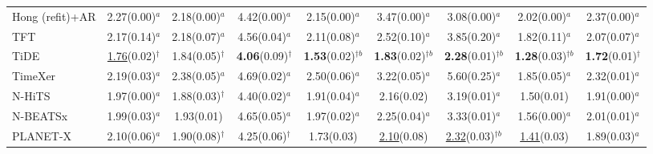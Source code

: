 \begin{table}[!t]
\begin{adjustbox}{max width=\linewidth}
\begin{tabular}{lcccccccc}
Hong (refit)+AR & 2.27{\scriptsize\color{gray}(0.00)}$^{a}$ & 2.18{\scriptsize\color{gray}(0.00)}$^{a}$ & 4.42{\scriptsize\color{gray}(0.00)}$^{a}$ & 2.15{\scriptsize\color{gray}(0.00)}$^{a}$ & 3.47{\scriptsize\color{gray}(0.00)}$^{a}$ & 3.08{\scriptsize\color{gray}(0.00)}$^{a}$ & 2.02{\scriptsize\color{gray}(0.00)}$^{a}$ & 2.37{\scriptsize\color{gray}(0.00)}$^{a}$ \\
TFT & 2.17{\scriptsize\color{gray}(0.14)}$^{a}$ & 2.18{\scriptsize\color{gray}(0.07)}$^{a}$ & 4.56{\scriptsize\color{gray}(0.04)}$^{a}$ & 2.11{\scriptsize\color{gray}(0.08)}$^{a}$ & 2.52{\scriptsize\color{gray}(0.10)}$^{a}$ & 3.85{\scriptsize\color{gray}(0.20)}$^{a}$ & 1.82{\scriptsize\color{gray}(0.11)}$^{a}$ & 2.07{\scriptsize\color{gray}(0.07)}$^{a}$ \\
TiDE & \underline{1.76}{\scriptsize\color{gray}(0.02)}$^{\dagger{}}$ & 1.84{\scriptsize\color{gray}(0.05)}$^{\dagger{}}$ & \textbf{4.06}{\scriptsize\color{gray}(0.09)}$^{\dagger{}}$ & \textbf{1.53}{\scriptsize\color{gray}(0.02)}$^{\dagger{}b}$ & \textbf{1.83}{\scriptsize\color{gray}(0.02)}$^{\dagger{}b}$ & \textbf{2.28}{\scriptsize\color{gray}(0.01)}$^{\dagger{}b}$ & \textbf{1.28}{\scriptsize\color{gray}(0.03)}$^{\dagger{}b}$ & \textbf{1.72}{\scriptsize\color{gray}(0.01)}$^{\dagger{}}$ \\
TimeXer & 2.19{\scriptsize\color{gray}(0.03)}$^{a}$ & 2.38{\scriptsize\color{gray}(0.05)}$^{a}$ & 4.69{\scriptsize\color{gray}(0.02)}$^{a}$ & 2.50{\scriptsize\color{gray}(0.06)}$^{a}$ & 3.22{\scriptsize\color{gray}(0.05)}$^{a}$ & 5.60{\scriptsize\color{gray}(0.25)}$^{a}$ & 1.85{\scriptsize\color{gray}(0.05)}$^{a}$ & 2.32{\scriptsize\color{gray}(0.01)}$^{a}$ \\
N-HiTS & 1.97{\scriptsize\color{gray}(0.00)}$^{a}$ & 1.88{\scriptsize\color{gray}(0.03)}$^{\dagger{}}$ & 4.40{\scriptsize\color{gray}(0.02)}$^{a}$ & 1.91{\scriptsize\color{gray}(0.04)}$^{a}$ & 2.16{\scriptsize\color{gray}(0.02)} & 3.19{\scriptsize\color{gray}(0.01)}$^{a}$ & 1.50{\scriptsize\color{gray}(0.01)} & 1.91{\scriptsize\color{gray}(0.00)}$^{a}$ \\
N-BEATSx & 1.99{\scriptsize\color{gray}(0.03)}$^{a}$ & 1.93{\scriptsize\color{gray}(0.01)} & 4.65{\scriptsize\color{gray}(0.05)}$^{a}$ & 1.97{\scriptsize\color{gray}(0.02)}$^{a}$ & 2.25{\scriptsize\color{gray}(0.04)}$^{a}$ & 3.33{\scriptsize\color{gray}(0.01)}$^{a}$ & 1.56{\scriptsize\color{gray}(0.00)}$^{a}$ & 2.01{\scriptsize\color{gray}(0.01)}$^{a}$ \\
PLANET-X & 2.10{\scriptsize\color{gray}(0.06)}$^{a}$ & 1.90{\scriptsize\color{gray}(0.08)}$^{\dagger{}}$ & 4.25{\scriptsize\color{gray}(0.06)}$^{\dagger{}}$ & 1.73{\scriptsize\color{gray}(0.03)} & \underline{2.10}{\scriptsize\color{gray}(0.08)} & \underline{2.32}{\scriptsize\color{gray}(0.03)}$^{\dagger{}b}$ & \underline{1.41}{\scriptsize\color{gray}(0.03)} & 1.89{\scriptsize\color{gray}(0.03)}$^{a}$ \\

\end{tabular}
\end{adjustbox}
\end{table}

